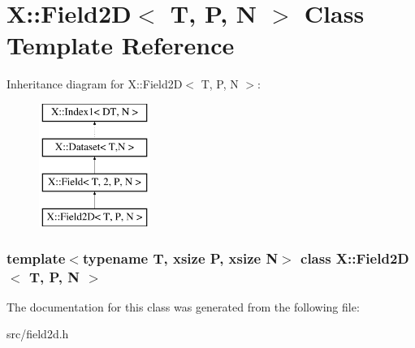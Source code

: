 \hypertarget{class_x_1_1_field2_d}{\section{X\-:\-:Field2\-D$<$ T, P, N $>$ Class Template Reference}
\label{class_x_1_1_field2_d}
}
Inheritance diagram for X\-:\-:Field2\-D$<$ T, P, N $>$\-:\begin{figure}[H]
\begin{center}
\leavevmode
\includegraphics[height=4.000000cm]{class_x_1_1_field2_d}
\end{center}
\end{figure}
\subsubsection*{template$<$typename T, xsize P, xsize N$>$ class X\-::\-Field2\-D$<$ T, P, N $>$}



The documentation for this class was generated from the following file\-:\begin{DoxyCompactItemize}
\item 
src/field2d.\-h\end{DoxyCompactItemize}
